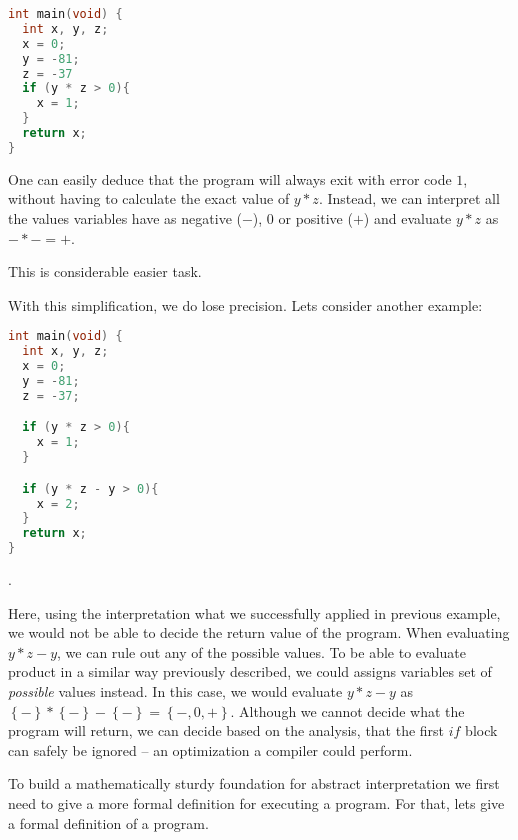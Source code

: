 \documentclass[..thesis.tex]{subfiles}
\begin{document}
\begin{lstlisting}[language=C,style=def]
int main(void) {
  int x, y, z;
  x = 0;
  y = -81;
  z = -37
  if (y * z > 0){
    x = 1;
  }
  return x;
}
\end{lstlisting}

One can easily deduce that the program will always exit with error code $1$, without having to calculate the exact value of  $y*z$.
Instead, we can interpret all the values variables have as negative ($-$), $0$ or positive ($+$) and evaluate $y * z$ as $-*- = +$.

This is considerable easier task.

With this simplification, we do lose precision. Lets consider another example:

\begin{lstlisting}[language=C,style=def]
int main(void) {
  int x, y, z;
  x = 0;
  y = -81;
  z = -37;

  if (y * z > 0){
    x = 1;
  }

  if (y * z - y > 0){
    x = 2;
  }
  return x;
}
\end{lstlisting}.


Here, using the interpretation what we successfully applied in previous example, we would not be able to decide the return value of the program. 
When evaluating $y * z - y $, we can rule out any of the possible values. To be able to evaluate product in a similar way previously described,
we could assigns variables set of \textit{possible} values instead. In this case, we would evaluate $y * z - y $ as $\left\lbrace - \right\rbrace * \left\lbrace
- \right\rbrace - \left\lbrace - \right\rbrace = \left\lbrace -,0,+ \right\rbrace$. Although we cannot decide what the program will return,
we can decide based on the analysis, that the first $if$ block can safely be ignored -- an optimization a compiler could perform.

To build a mathematically sturdy foundation for abstract interpretation we first need to give a more formal definition for executing a program.
 For that, lets give a formal definition of a program.
\end{document}
